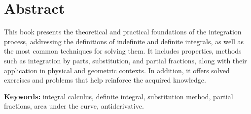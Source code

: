 \chapter*{Abstract}

This book presents the theoretical and practical foundations of the integration process, addressing the definitions of indefinite and definite integrals, as well as the most common techniques for solving them. It includes properties, methods such as integration by parts, substitution, and partial fractions, along with their application in physical and geometric contexts. In addition, it offers solved exercises and problems that help reinforce the acquired knowledge.

\textbf{Keywords:} integral calculus, definite integral, substitution method, partial fractions, area under the curve, antiderivative.